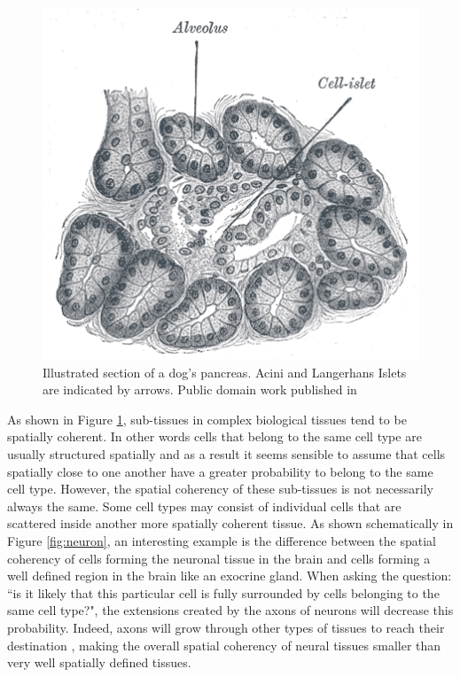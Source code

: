 \begin{figure}[bth]
\begin{center}
  \includegraphics[width=0.8\linewidth]{gfx/chapter1/pancreas.png}
\end{center}
  \caption{Illustrated section of a dog's pancreas. Acini and Langerhans Islets are indicated by arrows. Public domain work published in \cite{williams80}}
  \label{fig:pancreas}
\end{figure}
    
     
    As shown in Figure \ref{fig:pancreas}, sub-tissues in complex biological tissues tend to be spatially coherent. In other words cells that belong to the same cell type are usually structured spatially and as a result it seems sensible to assume that cells spatially close to one another have a greater probability to belong to the same cell type. However, the spatial coherency of these sub-tissues is not necessarily always the same. Some cell types may consist of individual cells that are scattered inside another more spatially coherent tissue. As shown schematically in Figure \ref{fig:neuron}, an interesting example is the difference between the spatial coherency of cells forming the neuronal tissue in the brain and cells forming a well defined region in the brain like an exocrine gland. When asking the question: ``is it likely that this particular cell is fully surrounded by cells belonging to the same cell type?", the extensions created by the axons of neurons will decrease this probability. Indeed, axons will grow through other types of tissues to reach their destination \cite{bartlett84,colello90}, making the overall spatial coherency of neural tissues smaller than very well spatially defined tissues.\\
    
